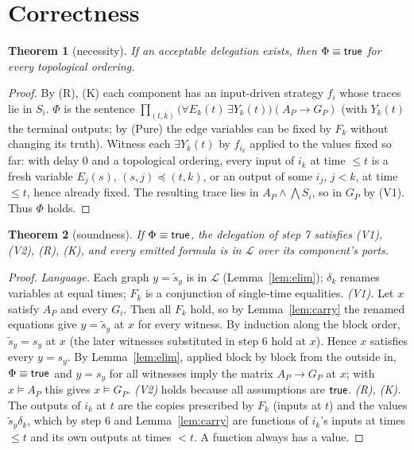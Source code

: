 \documentclass[10pt]{article}
\theoremstyle{plain}\newtheorem{theorem}{Theorem}\newtheorem{lemma}{Lemma}
\theoremstyle{definition}\newtheorem{definition}{Definition}
\begin{document}
\section{Correctness}
\begin{theorem}[necessity]\label{thm:nec}
If an acceptable delegation exists, then $\Phi\equiv\mathsf{true}$ for every topological ordering.
\end{theorem}
\begin{proof}
By (R), (K) each component has an input-driven strategy $f_i$ whose traces lie in $S_i$. $\Phi$ is the sentence $\prod_{(t,k)}\big(\forall E_k(t)\,\exists Y_k(t)\big)(A_P\to G_P)$ (with $Y_k(t)$ the terminal outputs; by (Pure) the edge variables can be fixed by $F_k$ without changing its truth). Witness each $\exists Y_k(t)$ by $f_{i_k}$ applied to the values fixed so far: with delay $0$ and a topological ordering, every input of $i_k$ at time $\le t$ is a fresh variable $E_j(s)$, $(s,j)\preceq(t,k)$, or an output of some $i_j$, $j<k$, at time $\le t$, hence already fixed. The resulting trace lies in $A_P\wedge\bigwedge S_i$, so in $G_P$ by (V1). Thus $\Phi$ holds.
\end{proof}
\begin{theorem}[soundness]\label{thm:sound}
If $\Phi\equiv\mathsf{true}$, the delegation of step 7 satisfies (V1), (V2), (R), (K), and every emitted formula is in $\mathcal L$ over its component's ports.
\end{theorem}
\begin{proof}
\emph{Language.} Each graph $y=\tilde s_y$ is in $\mathcal L$ (Lemma~\ref{lem:elim}); $\delta_k$ renames variables at equal times; $F_k$ is a conjunction of single-time equalities.
\emph{(V1).} Let $x$ satisfy $A_P$ and every $G_i$. Then all $F_k$ hold, so by Lemma~\ref{lem:carry} the renamed equations give $y=\tilde s_y$ at $x$ for every witness. By induction along the block order, $\tilde s_y=s_y$ at $x$ (the later witnesses substituted in step 6 hold at $x$). Hence $x$ satisfies every $y=s_y$. By Lemma~\ref{lem:elim}, applied block by block from the outside in, $\Phi\equiv\mathsf{true}$ and $y=s_y$ for all witnesses imply the matrix $A_P\to G_P$ at $x$; with $x\models A_P$ this gives $x\models G_P$.
\emph{(V2)} holds because all assumptions are $\mathsf{true}$.
\emph{(R), (K).} The outputs of $i_k$ at $t$ are the copies prescribed by $F_k$ (inputs at $t$) and the values $\tilde s_y\delta_k$, which by step 6 and Lemma~\ref{lem:carry} are functions of $i_k$'s inputs at times $\le t$ and its own outputs at times $<t$. A function always has a value.
\end{proof}
\end{document}

